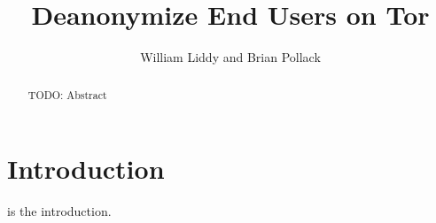 \documentclass[10pt,journal]{IEEEtran}
\begin{document}
\title{Deanonymize End Users on Tor}
\author{William Liddy and Brian Pollack}
\maketitle

\begin{abstract}
TODO: Abstract
\end{abstract}

\section{Introduction}
 is the introduction.
\end{document}
